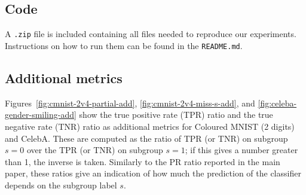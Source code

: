 \subsection{Code}
A \texttt{.zip} file is included containing all files needed to reproduce our experiments. Instructions on how to run them can be found in the \texttt{README.md}.

\subsection{Additional metrics}
Figures~\ref{fig:cmnist-2v4-partial-add}, \ref{fig:cmnist-2v4-miss-s-add},  and \ref{fig:celeba-gender-smiling-add} show the true positive rate (TPR) ratio and the true negative rate (TNR) ratio as additional metrics for Coloured MNIST (2 digits) and CelebA.
These are computed as the ratio of TPR (or TNR) on subgroup $s=0$ over the TPR (or TNR) on subgroup $s=1$; if this gives a number greater than 1, the inverse is taken.
Similarly to the PR ratio reported in the main paper, these ratios give an indication of how much the prediction of the classifier depends on the subgroup label $s$.

